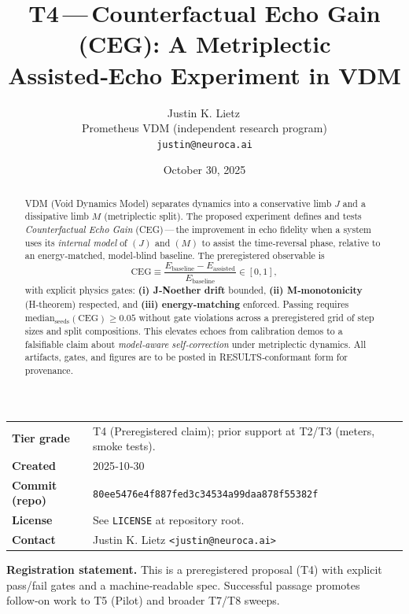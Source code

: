 \documentclass{article}
\title{T4\,—\,Counterfactual Echo Gain (CEG): A Metriplectic Assisted‑Echo Experiment in VDM}
\author{%
  Justin K. Lietz\,\orcidlink{0009-0008-9028-1366}\\
  \normalsize Prometheus VDM (independent research program)\\
  \texttt{justin@neuroca.ai}
}
\date{October 30, 2025}
\begin{document}
\maketitle

\begin{abstract}
\noindent
VDM (Void Dynamics Model) separates dynamics into a conservative limb $J$ and a dissipative limb $M$ (metriplectic split). The proposed experiment defines and tests \emph{Counterfactual Echo Gain} (CEG)\,—\,the improvement in echo fidelity when a system uses its \emph{internal model} of $(J)$ and $(M)$ to assist the time‑reversal phase, relative to an energy‑matched, model‑blind baseline. The preregistered observable is
\[
\mathrm{CEG} \equiv \frac{E_{\text{baseline}} - E_{\text{assisted}}}{E_{\text{baseline}}} \in [0,1],
\]
with explicit physics gates: \textbf{(i) J‑Noether drift} bounded, \textbf{(ii) M‑monotonicity} (\mbox{H‑theorem}) respected, and \textbf{(iii) energy‑matching} enforced. Passing requires $\mathrm{median}_{\text{seeds}}(\mathrm{CEG}) \ge 0.05$ without gate violations across a preregistered grid of step sizes and split compositions. This elevates echoes from calibration demos to a falsifiable claim about \emph{model‑aware self‑correction} under metriplectic dynamics. All artifacts, gates, and figures are to be posted in RESULTS‑conformant form for provenance.
\end{abstract}


\begin{center}
\begin{tabular}{@{}ll@{}}
\toprule
\textbf{Tier grade} & T4 (Preregistered claim); prior support at T2/T3 (meters, smoke tests).\\
\textbf{Created} & 2025‑10‑30 \\
\textbf{Commit (repo)} & \texttt{80ee5476e4f887fed3c34534a99daa878f55382f} \\
\textbf{License} & See \texttt{LICENSE} at repository root. \\
\textbf{Contact} & Justin K. Lietz \texttt{<justin@neuroca.ai>} \\
\bottomrule
\end{tabular}
\end{center}

\vspace{0.7em}
\noindent\textbf{Registration statement.} This is a preregistered proposal (T4) with explicit pass/fail gates and a machine‑readable spec. Successful passage promotes follow‑on work to T5 (Pilot) and broader T7/T8 sweeps.
\end{document}
